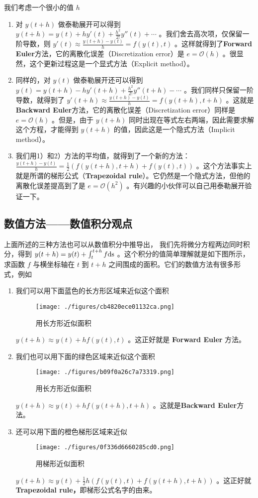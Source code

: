 我们考虑一个很小的值 $h$ 
\begin{enumerate}
\item 对 $y(t+h)$ 做泰勒展开可以得到 $y(t+h)=y(t)+hy'(t)+\frac{h^2}{2!}y''(t)+\cdots$ 。我们舍去高次项，仅保留一阶导数，则 $y'(t)\approx \frac{y(t+h)-y(t)}{h}= f(y(t),t)$ 。这样就得到了\textbf{Forward Euler}方法，它的离散化误差（Discretization error）是 $e=\mathcal{O}(h)$ 。很显然，这个更新过程这是一个显式方法（Explicit method）。
\item 同样的，对 $y(t)$ 做泰勒展开还可以得到 $y(t)=y(t+h)-hy'(t+h)+\frac{h^2}{2!}y''(t+h)-\cdots$ 。我们同样只保留一阶导数，就得到了 $y'(t+h)\approx \frac{y(t+h)-y(t)}{h}= f(y(t+h),t+h)$ 。这就是\textbf{Backward Euler}方法，它的离散化误差（Discretization error）同样是 $e=\mathcal{O}(h)$ 。但是，由于 $y(t+h)$ 同时出现在等式左右两端，因此需要求解这个方程，才能得到 $y(t+h)$ 的值，因此这是一个隐式方法（Implicit method）。
\item 我们用1）和2）方法的平均值，就得到了一个新的方法： $ \frac{y(t+h)-y(t)}{h}= \frac{1}{2}\left(f(y(t+h),t+h)+f(y(t),t)\right)$ 。这个方法事实上就是所谓的梯形公式（\textbf{Trapezoidal rule}）。它仍然是一个隐式方法，但他的离散化误差提高到了是 $e=\mathcal{O}(h^2)$ 。有兴趣的小伙伴可以自己用泰勒展开验证一下。
\end{enumerate}


\subsection{数值方法——数值积分观点}

上面所述的三种方法也可以从数值积分中推导出， 我们先将微分方程两边同时积分，得到 $y(t+h)=y(t)+\int_t^{t+h}f \rm{d}s$ 。这个积分的值简单理解就是如下图所示，求函数 $f$ 与横坐标轴在 $t$ 到 $t+h$ 之间围成的面积。它们的数值方法有很多形式，例如

\begin{enumerate}
\item 我们可以用下面蓝色的长方形区域来近似这个面积
\begin{figure}[ht]
\centering
\texttt{[image: ./figures/cb4820ece01132ca.png]}
\caption{用长方形近似面积} \label{fig_NordEq_1}
\end{figure}
$y(t+h)\approx y(t)+hf(y(t),t)$ 。这正好就是 \textbf{Forward Euler }方法。
\item 我们也可以用下面的绿色区域来近似这个面积
\begin{figure}[ht]
\centering
\texttt{[image: ./figures/b09f0a26c7a73319.png]}
\caption{用长方形近似面积} \label{fig_NordEq_2}
\end{figure}
$y(t+h)\approx y(t)+hf(y(t+h),t+h)$ 。这就是\textbf{Backward Euler}方法。
\item 还可以用下面的橙色梯形区域来近似
\begin{figure}[ht]
\centering
\texttt{[image: ./figures/0f336d6660285cd0.png]}
\caption{用梯形近似面积} \label{fig_NordEq_3}
\end{figure}
$y(t+h)\approx y(t)+\frac{1}{2}h\left(f(y(t),t)+f(y(t+h),t+h)\right)$ 。这正好就\textbf{Trapezoidal rule，}即梯形公式名字的由来。
\end{enumerate}


